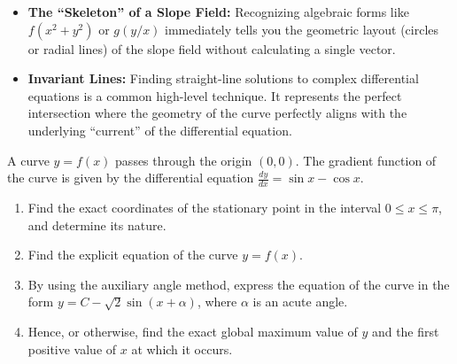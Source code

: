 \begin{takeaways}
\begin{itemize}[leftmargin=*]
    \item \textbf{The ``Skeleton'' of a Slope Field:} Recognizing algebraic forms like $f(x^2+y^2)$ or $g(y/x)$ immediately tells you the geometric layout (circles or radial lines) of the slope field without calculating a single vector.
    \item \textbf{Invariant Lines:} Finding straight-line solutions to complex differential equations is a common high-level technique. It represents the perfect intersection where the geometry of the curve perfectly aligns with the underlying ``current'' of the differential equation.
\end{itemize}
\end{takeaways}

\begin{problem}
A curve $y = f(x)$ passes through the origin $(0,0)$. The gradient function of the curve is given by the differential equation $\frac{dy}{dx} = \sin x - \cos x$.

\begin{enumerate}
    \item[\textbf{i}] Find the exact coordinates of the stationary point in the interval $0 \le x \le \pi$, and determine its nature.
    \item[\textbf{ii}] Find the explicit equation of the curve $y = f(x)$.
    \item[\textbf{iii}] By using the auxiliary angle method, express the equation of the curve in the form $y = C - \sqrt{2}\sin(x + \alpha)$, where $\alpha$ is an acute angle.
    \item[\textbf{iv}] Hence, or otherwise, find the exact global maximum value of $y$ and the first positive value of $x$ at which it occurs.
\end{enumerate}
\end{problem}

